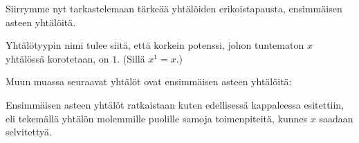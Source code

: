 Siirrymme nyt tarkastelemaan tärkeää yhtälöiden erikoistapausta, ensimmäisen asteen yhtälöitä.


Yhtälötyypin nimi tulee siitä, että korkein potenssi, johon tuntematon $x$
yhtälössä korotetaan, on $1$. (Sillä $x^{1}=x$.)

\begin{esimerkki}
Muun muassa seuraavat yhtälöt ovat ensimmäisen asteen yhtälöitä:
\end{esimerkki}

%		

Ensimmäisen asteen yhtälöt ratkaistaan kuten edellisessä kappaleessa esitettiin, eli tekemällä yhtälön molemmille puolille 
samoja toimenpiteitä, kunnes $x$ saadaan selvitettyä. 

